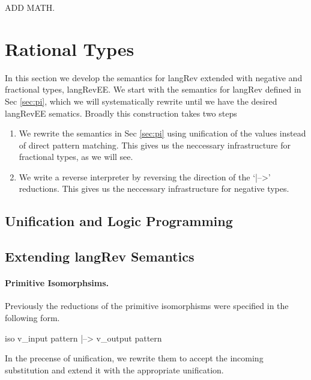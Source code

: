 \documentclass[preprint]{sigplanconf}
\begin{document}
{ADD MATH. 

\section{Rational Types}
\label{sec:rat}

In this section we develop the semantics for {{langRev}} extended with
negative and fractional types, {{langRevEE}}.  We start with the
semantics for {{langRev}} defined in Sec \ref{sec:pi}, which we will
systematically rewrite until we have the desired {{langRevEE}}
sematics. Broadly this construction takes two steps 

\begin{enumerate}
\item We rewrite the semantics in Sec \ref{sec:pi} using unification
  of the values instead of direct pattern matching. This gives us the
  neccessary infrastructure for fractional types, as we will see. 

\item We write a reverse interpreter by reversing the direction of the
  `{{|-->}}' reductions. This gives us the neccessary infrastructure for
  negative types.
\end{enumerate}


\subsection{Unification and Logic Programming}



\subsection{Extending {{langRev}} Semantics}


\paragraph{Primitive Isomorphsims.}
Previously the reductions of the primitive isomorphisms were specified
in the following form.

{{ iso v_{input pattern} |--> v_{output pattern} }}

\noindent
In the precense of unification, we rewrite them to accept the incoming
substitution and extend it with the appropriate unification.

}
\end{document}
